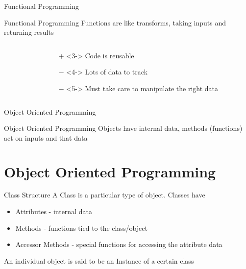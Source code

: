 \documentclass[mathserif]{beamer}
\providecommand{\inputcode}[1]{
  \begin{block}{}
    \scriptsize{}
  \end{block}
}
\begin{document}
\begin{frame}{Functional Programming}
  \begin{block}{Functional Programming}
    Functions are like transforms, taking inputs and returning results
  \end{block}
  \begin{columns}
    \begin{column}{0.49\linewidth}
      \uncover<2->{\inputcode{styles/functional}}
    \end{column}
    \begin{column}{0.49\linewidth}
      \begin{itemize}
        \item[$+$]<3-> Code is reusable
        \item[$-$]<4-> Lots of data to track
        \item[$-$]<5-> Must take care to manipulate the right data
      \end{itemize}
    \end{column}
  \end{columns}
\end{frame}

\begin{frame}{Object Oriented Programming}
  \begin{block}{Object Oriented Programming}
    Objects have internal data, methods (functions) act on inputs and that data
  \end{block}
  \visible<2->{\inputcode{styles/objective}}
\end{frame}

\section{Object Oriented Programming}

\begin{frame}{Class Structure}
  A \alert{Class} is a particular type of object. Classes have
  \begin{itemize}
    \item \alert{Attributes} - internal data
    \item \alert{Methods} - functions tied to the class/object
    \item \alert{Accessor Methods} - special functions for accessing the attribute data
  \end{itemize}

  An individual object is said to be an \alert{Instance} of a certain class
\end{frame}
\end{document}
